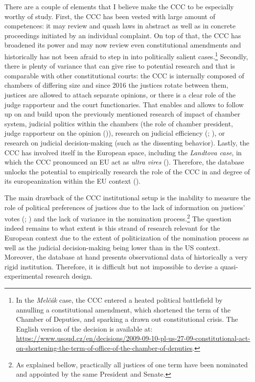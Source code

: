 \documentclass[
  11pt,
]{article}
\begin{document}
There are a couple of elements that I believe make the CCC to be especially worthy of study. First, the CCC has been vested with large amount of competences: it may review and quash laws in abstract as well as in concrete proceedings initiated by an individual complaint. On top of that, the CCC has broadened its power and may now review even constitutional amendments and historically has not been afraid to step in into politically salient cases.\footnote{In the \emph{Melčák} case, the CCC entered a heated political battlefield by annulling a constitutional amendment, which shortened the term of the Chamber of Deputies, and sparking a drawn out constitutional crisis. The English version of the decision is available at: \url{https://www.usoud.cz/en/decisions/2009-09-10-pl-us-27-09-constitutional-act-on-shortening-the-term-of-office-of-the-chamber-of-deputies}.} Secondly, there is plenty of variance that can give rise to potential research and that is comparable with other constitutional courts: the CCC is internally composed of chambers of differing size and since 2016 the justices rotate between them, justices are allowed to attach separate opinions, or there is a clear role of the judge rapporteur and the court functionaries. That enables and allows to follow up on and build upon the previously mentioned research of impact of chamber system, judicial politics within the chambers (the role of chamber president, judge rapporteur on the opinion ()), research on judicial efficiency (; ), or research on judicial decision-making (such as the dissenting behavior). Lastly, the CCC has involved itself in the European space, including the \emph{Landtova case}, in which the CCC pronounced an EU act as \emph{ultra vires} (). Therefore, the database unlocks the potential to empirically research the role of the CCC in and degree of its europeanization within the EU context ().

The main drawback of the CCC institutional setup is the inability to measure the role of political preferences of justices due to the lack of information on justices' votes (; ) and the lack of variance in the nomination process.\footnote{As explained bellow, practically all justices of one term have been nominated and appointed by the same President and Senate.} The question indeed remains to what extent is this strand of research relevant for the European context due to the extent of politicization of the nomination process as well as the judicial decision-making being lower than in the US context. Moreover, the database at hand presents observational data of historically a very rigid institution. Therefore, it is difficult but not impossible to devise a quasi-experimental research design.
\end{document}

